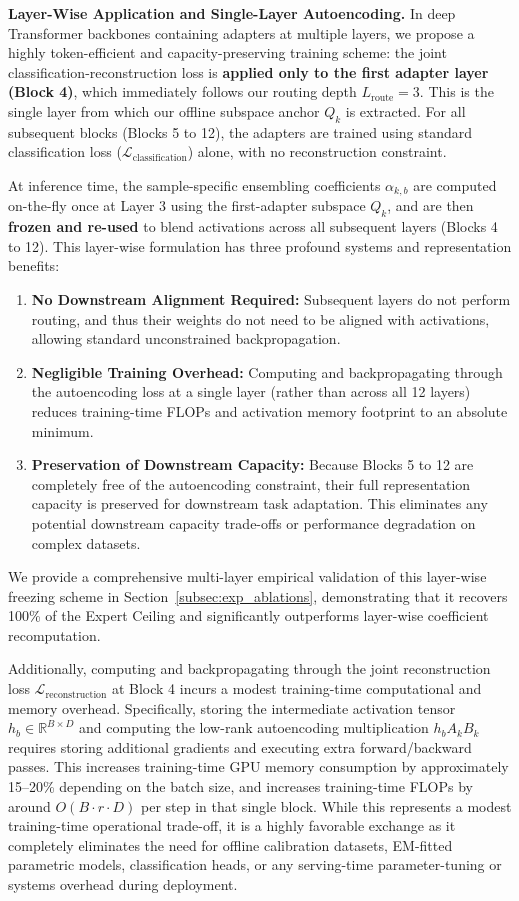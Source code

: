 \textbf{Layer-Wise Application and Single-Layer Autoencoding.}
In deep Transformer backbones containing adapters at multiple layers, we propose a highly token-efficient and capacity-preserving training scheme: the joint classification-reconstruction loss is \textbf{applied only to the first adapter layer (Block 4)}, which immediately follows our routing depth $L_{\text{route}} = 3$. This is the single layer from which our offline subspace anchor $Q_k$ is extracted. For all subsequent blocks (Blocks 5 to 12), the adapters are trained using standard classification loss ($\mathcal{L}_{\text{classification}}$) alone, with no reconstruction constraint. 

At inference time, the sample-specific ensembling coefficients $\alpha_{k, b}$ are computed on-the-fly once at Layer 3 using the first-adapter subspace $Q_k$, and are then \textbf{frozen and re-used} to blend activations across all subsequent layers (Blocks 4 to 12). This layer-wise formulation has three profound systems and representation benefits:
\begin{enumerate}
    \item \textbf{No Downstream Alignment Required:} Subsequent layers do not perform routing, and thus their weights do not need to be aligned with activations, allowing standard unconstrained backpropagation.
    \item \textbf{Negligible Training Overhead:} Computing and backpropagating through the autoencoding loss at a single layer (rather than across all 12 layers) reduces training-time FLOPs and activation memory footprint to an absolute minimum.
    \item \textbf{Preservation of Downstream Capacity:} Because Blocks 5 to 12 are completely free of the autoencoding constraint, their full representation capacity is preserved for downstream task adaptation. This eliminates any potential downstream capacity trade-offs or performance degradation on complex datasets.
\end{enumerate}
We provide a comprehensive multi-layer empirical validation of this layer-wise freezing scheme in Section~\ref{subsec:exp_ablations}, demonstrating that it recovers 100\% of the Expert Ceiling and significantly outperforms layer-wise coefficient recomputation.

Additionally, computing and backpropagating through the joint reconstruction loss $\mathcal{L}_{\text{reconstruction}}$ at Block 4 incurs a modest training-time computational and memory overhead. Specifically, storing the intermediate activation tensor $h_b \in \mathbb{R}^{B \times D}$ and computing the low-rank autoencoding multiplication $h_b A_k B_k$ requires storing additional gradients and executing extra forward/backward passes. This increases training-time GPU memory consumption by approximately 15--20\% depending on the batch size, and increases training-time FLOPs by around $O(B \cdot r \cdot D)$ per step in that single block. While this represents a modest training-time operational trade-off, it is a highly favorable exchange as it completely eliminates the need for offline calibration datasets, EM-fitted parametric models, classification heads, or any serving-time parameter-tuning or systems overhead during deployment.

